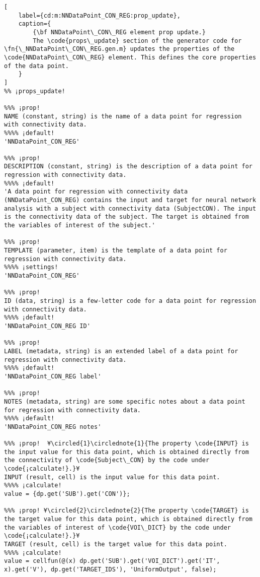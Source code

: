 \documentclass{tufte-handout}
\begin{document}
\begin{lstlisting}[
	label={cd:m:NNDataPoint_CON_REG:prop_update},
	caption={
		{\bf NNDataPoint\_CON\_REG element prop update.}
		The \code{props\_update} section of the generator code for \fn{\_NNDataPoint\_CON\_REG.gen.m} updates the properties of the \code{NNDataPoint\_CON\_REG} element. This defines the core properties of the data point.
	}
]
%% ¡props_update!

%%% ¡prop!
NAME (constant, string) is the name of a data point for regression with connectivity data.
%%%% ¡default!
'NNDataPoint_CON_REG'

%%% ¡prop!
DESCRIPTION (constant, string) is the description of a data point for regression with connectivity data.
%%%% ¡default!
'A data point for regression with connectivity data (NNDataPoint_CON_REG) contains the input and target for neural network analysis with a subject with connectivity data (SubjectCON). The input is the connectivity data of the subject. The target is obtained from the variables of interest of the subject.'

%%% ¡prop!
TEMPLATE (parameter, item) is the template of a data point for regression with connectivity data.
%%%% ¡settings!
'NNDataPoint_CON_REG'

%%% ¡prop!
ID (data, string) is a few-letter code for a data point for regression with connectivity data.
%%%% ¡default!
'NNDataPoint_CON_REG ID'

%%% ¡prop!
LABEL (metadata, string) is an extended label of a data point for regression with connectivity data.
%%%% ¡default!
'NNDataPoint_CON_REG label'

%%% ¡prop!
NOTES (metadata, string) are some specific notes about a data point for regression with connectivity data.
%%%% ¡default!
'NNDataPoint_CON_REG notes'

%%% ¡prop!  ¥\circled{1}\circlednote{1}{The property \code{INPUT} is the input value for this data point, which is obtained directly from the connectivity of \code{Subject\_CON} by the code under \code{¡calculate!}.}¥
INPUT (result, cell) is the input value for this data point.
%%%% ¡calculate!
value = {dp.get('SUB').get('CON')};
    
%%% ¡prop! ¥\circled{2}\circlednote{2}{The property \code{TARGET} is the target value for this data point, which is obtained directly from the variables of interest of \code{VOI\_DICT} by the code under \code{¡calculate!}.}¥
TARGET (result, cell) is the target value for this data point.
%%%% ¡calculate!
value = cellfun(@(x) dp.get('SUB').get('VOI_DICT').get('IT', x).get('V'), dp.get('TARGET_IDS'), 'UniformOutput', false);

\end{lstlisting}
\end{document}
